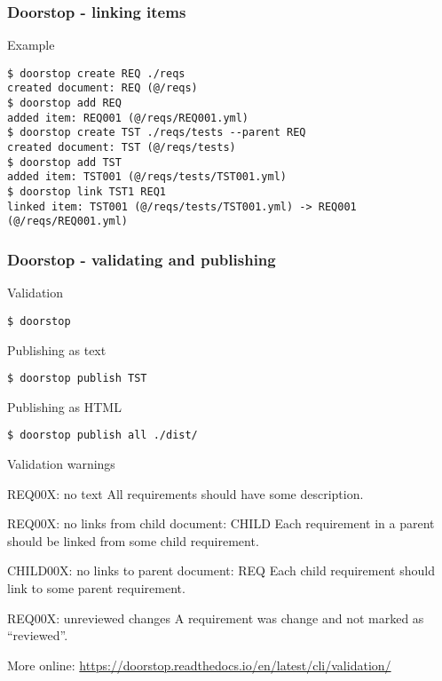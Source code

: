 \documentclass[aspectratio=169]{beamer}
\begin{document}
\begin{frame}[fragile]
  \frametitle{Doorstop - linking items}
  \begin{block}{Example}
   \begin{verbatim}
$ doorstop create REQ ./reqs
created document: REQ (@/reqs)
$ doorstop add REQ
added item: REQ001 (@/reqs/REQ001.yml)
$ doorstop create TST ./reqs/tests --parent REQ
created document: TST (@/reqs/tests)
$ doorstop add TST
added item: TST001 (@/reqs/tests/TST001.yml)
$ doorstop link TST1 REQ1
linked item: TST001 (@/reqs/tests/TST001.yml) -> REQ001 (@/reqs/REQ001.yml)
   \end{verbatim}
   \end{block}
\end{frame}

\begin{frame}[fragile]
  \frametitle{Doorstop - validating and publishing}
 \begin{block}{Validation}
   \begin{verbatim}
$ doorstop
   \end{verbatim}
   \end{block}
 \begin{block}{Publishing as text}
   \begin{verbatim}
$ doorstop publish TST
   \end{verbatim}
   \end{block}
 \begin{block}{Publishing as HTML}
   \begin{verbatim}
$ doorstop publish all ./dist/
   \end{verbatim}
   \end{block}
\end{frame}


\begin{slide}{Validation warnings}

\begin{block}{REQ00X: no text}
All requirements should have some description.
\end{block}
\begin{block}{REQ00X: no links from child document: CHILD}
Each requirement in a parent should be linked from some child requirement.
\end{block}
\begin{block}{CHILD00X: no links to parent document: REQ}
Each child requirement should link to some  parent requirement.
\end{block}
\begin{block}{REQ00X: unreviewed changes}
A requirement was change and not marked as ``reviewed''.
\end{block}

\begin{alertblock}{More online:}\centering
\url{https://doorstop.readthedocs.io/en/latest/cli/validation/}
\end{alertblock}

\end{slide}
\end{document}
